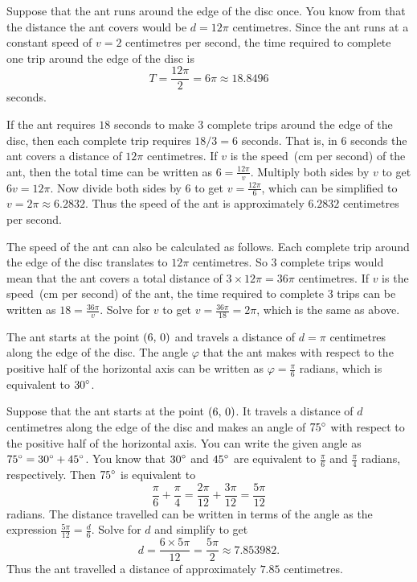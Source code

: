 \documentclass[a4paper,oneside,12pt]{article}
\begin{document}
\begin{problem}
{\begin{solution}
Suppose that the ant runs around the edge of the disc once.  You know
from  that the distance the
ant covers would be $d = 12\pi$ centimetres.  Since the ant runs at a
constant speed of $v = 2$ centimetres per second, the time required to
complete one trip around the edge of the disc is
\[
T
=
\frac{12\pi}{2}
=
6\pi
\approx
18.8496
\]
seconds.

If the ant requires $18$ seconds to make $3$ complete trips around the
edge of the disc, then each complete trip requires
$18 / 3 = 6$ seconds.  That is, in $6$ seconds the ant covers a
distance of $12\pi$ centimetres.  If $v$ is the speed~(cm per second)
of the ant, then the total time can be written as
$6 = \frac{12\pi}{v}$.  Multiply both sides by $v$ to get
$6v = 12\pi$.  Now divide both sides by $6$ to get
$v = \frac{12\pi}{6}$, which can be simplified to
$v = 2\pi \approx 6.2832$.  Thus the speed of the ant is approximately
$6.2832$ centimetres per second.

The speed of the ant can also be calculated as follows.  Each complete
trip around the edge of the disc translates to $12\pi$ centimetres.
So $3$ complete trips would mean that the ant covers a total distance
of $3 \times 12\pi = 36\pi$ centimetres.  If $v$ is the speed~(cm per
second) of the ant, the time required to complete $3$ trips can be
written as $18 = \frac{36\pi}{v}$.  Solve for $v$ to get
$v = \frac{36\pi}{18} = 2\pi$, which is the same as above.

The ant starts at the point $\left\lparen{6},\, {0}\right\rparen$ and travels a distance of
$d = \pi$ centimetres along the edge of the disc.  The angle $\varphi$
that the ant makes with respect to the positive half of the horizontal
axis can be written as $\varphi = \frac{\pi}{6}$ radians, which is
equivalent to ${30}^{\circ}$.

Suppose that the ant starts at the point $\left\lparen{6},\, {0}\right\rparen$.  It travels a
distance of $d$ centimetres along the edge of the disc and makes an
angle of ${75}^{\circ}$ with respect to the positive half of the
horizontal axis.  You can write the given angle as
${75}^{\circ} = {30}^{\circ} + {45}^{\circ}$.  You know that
${30}^{\circ}$ and ${45}^{\circ}$ are equivalent to $\frac{\pi}{6}$ and
$\frac{\pi}{4}$ radians, respectively.  Then ${75}^{\circ}$ is
equivalent to
\[
\frac{\pi}{6} + \frac{\pi}{4}
=
\frac{2\pi}{12} + \frac{3\pi}{12}
=
\frac{5\pi}{12}
\]
radians.  The distance travelled can be written in terms of the angle
as the expression $\frac{5\pi}{12} = \frac{d}{6}$.  Solve for $d$ and
simplify to get
\[
d
=
\frac{6 \times 5\pi}{12}
=
\frac{5\pi}{2}
\approx
7.853982.
\]
Thus the ant travelled a distance of approximately $7.85$
centimetres.


\end{solution}}
\end{problem}
\end{document}
